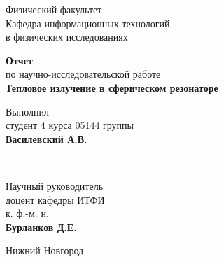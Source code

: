 \makeatletter
\begin{titlepage}

	\newpage

    \noindent{}

	\vspace*{50pt}

	Физический факультет \\[\baselineskip]

	Кафедра информационных технологий\\
	в физических исследованиях

	\vspace*{100pt}

	{\Large\textbf{Отчет}} \\
	по научно-исследовательской работе \\[\baselineskip]

	{\Large\textbf{Тепловое излучение в сферическом резонаторе}}

	\vspace*{\fill}

	\hfill\begin{minipage}{15em}
    	Выполнил\\
		студент 4 курса 05144 группы\\
		\textbf{Василевский А.В.}
    \end{minipage} \\[\baselineskip]

	\hfill\begin{minipage}{15em}
    	Научный руководитель\\
		доцент кафедры ИТФИ\\
		к. ф.-м. н.\\
		\textbf{Бурланков Д.Е.}
    \end{minipage}

	\vspace*{\fill}

	Нижний Новгород\par


\end{titlepage}
\makeatother
